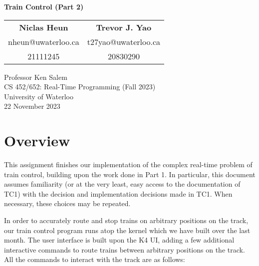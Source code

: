 \documentclass[12pt, titlepage]{article}
\begin{document}
    \begin{titlepage}
        \begin{center}
            \vspace*{5em}
            \textbf{\LARGE Train Control (Part 2)}
            \vspace*{3em}

            \begin{tabular}{c@{\hskip 8em}c}
                \textbf{\large Niclas Heun} & \textbf{\large Trevor J. Yao} \\
                {\small nheun@uwaterloo.ca} & {\small t27yao@uwaterloo.ca} \\
                {\footnotesize 21111245} & {\footnotesize 20830290} \\
            \end{tabular}

            \vfill

            Professor Ken Salem \\
            CS 452/652: Real-Time Programming (Fall 2023) \\
            University of Waterloo \\
            22 November 2023

            \vspace*{5em}

        \end{center}
    \end{titlepage}

    \pagestyle{fancy}

    \tableofcontents
    \listoffigures
    \pagebreak

    \section{Overview}
    \label{sec:overview}

    This assignment finishes our implementation of the complex real-time problem of train control, building upon the work done in Part 1. In particular, this document assumes familiarity (or at the very least, easy access to the documentation of TC1) with the decision and implementation decisions made in TC1. When necessary, these choices may be repeated.
    
    In order to accurately route and stop trains on arbitrary positions on the track, our train control program runs atop the kernel which we have built over the last month. The user interface is built upon the K4 UI, adding a few additional interactive commands to route trains between arbitrary positions on the track. All the commands to interact with the track are as follows:
\end{document}
